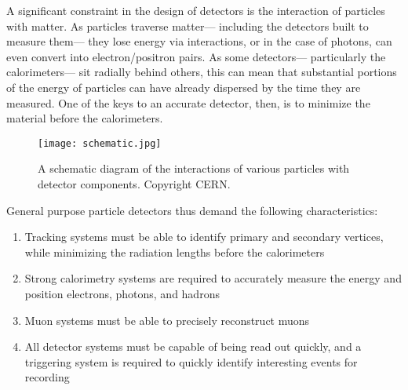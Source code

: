 A significant constraint in the design of detectors is the interaction of particles with matter. As particles traverse matter--- including the detectors built to measure them--- they lose energy via interactions, or in the case of photons, can even convert into electron/positron pairs. As some detectors--- particularly the calorimeters--- sit radially behind others, this can mean that substantial portions of the energy of particles can have already dispersed by the time they are measured. One of the keys to an accurate detector, then, is to minimize the material before the calorimeters. 



\begin{figure}
\centering
\texttt{[image: schematic.jpg]}
\label{fig:detector:schematic}
\caption{A schematic diagram of the interactions of various particles with detector components. Copyright CERN.}
\end{figure}


General purpose particle detectors thus demand the following characteristics: 

\begin{enumerate}
	\item Tracking systems must be able to identify primary and secondary vertices, while minimizing the radiation lengths before the calorimeters
	\item Strong calorimetry systems are required to accurately measure the energy and position electrons, photons, and hadrons
	\item Muon systems must be able to precisely reconstruct muons
	\item All detector systems must be capable of being read out quickly, and a triggering system is required to quickly identify interesting events for recording
\end{enumerate}

